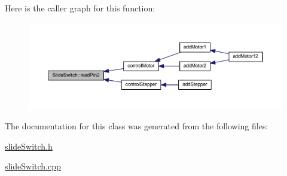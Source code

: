 Here is the caller graph for this function\+:\nopagebreak
\begin{figure}[H]
\begin{center}
\leavevmode
\includegraphics[width=350pt]{class_slide_switch_ada186df3375d7dcd7dac6470c9832830_icgraph}
\end{center}
\end{figure}


The documentation for this class was generated from the following files\+:\begin{DoxyCompactItemize}
\item 
\hyperlink{slide_switch_8h}{slide\+Switch.\+h}\item 
\hyperlink{slide_switch_8cpp}{slide\+Switch.\+cpp}\end{DoxyCompactItemize}
